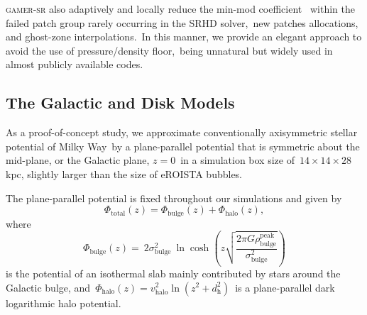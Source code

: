 \documentclass[twocolumn]{aastex631}
\begin{document}
  \textsc{gamer-sr} also adaptively and locally reduce the min-mod coefficient\
  \citep{tseng2021} within the failed patch group rarely occurring in the SRHD solver,\
  new patches allocations, and ghost-zone interpolations.\
  In this manner, we provide an elegant approach to avoid the use of pressure/density floor,\
  being unnatural but widely used in almost publicly available codes.\

  \subsection{The Galactic and Disk Models}
  As a proof-of-concept study, we approximate conventionally axisymmetric stellar potential of Milky Way\
  by a plane-parallel potential that is symmetric about the mid-plane, or the Galactic plane, $z=0$\
  in a simulation box size of\
  $14\times14\times28$ kpc, slightly larger than the size of eROISTA bubbles.

  The plane-parallel potential is fixed throughout our simulations and given by
  \begin{equation}
    \Phi_{\text{total}}(z) = \Phi_{\text{bulge}}(z) + \Phi_{\text{halo}}(z),
  \end{equation}
  where
  \begin{equation}
    \Phi_{\text{bulge}}(z)=\
    2\sigma^2_{\text{bulge}}\
    \ln\cosh\left(z\sqrt{\frac{2\pi G\rho_{\text{bulge}}^{\text{peak}}}{\sigma^2_{\text{bulge}}}}\right)
  \end{equation}
  is the potential of an isothermal slab mainly contributed by stars around the Galactic bulge, and\
  $\Phi_{\text{halo}}(z)=v^2_{\text{halo}}\ln\left(z^2+d^2_{\text{h}}\right)$\
  is a plane-parallel dark logarithmic halo potential.
\end{document}
